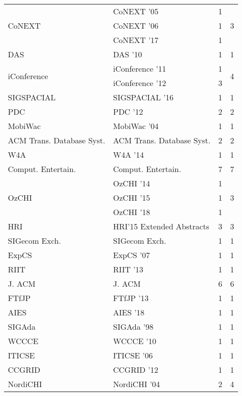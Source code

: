 \begin{table*}[t]
\begin{tabular}{llrr}
\multirow{3}{*}{CoNEXT } & CoNEXT '05 & 1 & \multirow{3}{*}{3}\\
& CoNEXT '06 & 1 &\\
& CoNEXT '17 & 1 &\\
\multirow{1}{*}{DAS } & DAS '10 & 1 & \multirow{1}{*}{1}\\
\multirow{2}{*}{iConference } & iConference '11 & 1 & \multirow{2}{*}{4}\\
& iConference '12 & 3 &\\
\multirow{1}{*}{SIGSPACIAL } & SIGSPACIAL '16 & 1 & \multirow{1}{*}{1}\\
\multirow{1}{*}{PDC } & PDC '12 & 2 & \multirow{1}{*}{2}\\
\multirow{1}{*}{MobiWac } & MobiWac '04 & 1 & \multirow{1}{*}{1}\\
\multirow{1}{*}{ACM Trans. Database Syst.} & ACM Trans. Database Syst. & 2 & \multirow{1}{*}{2}\\
\multirow{1}{*}{W4A } & W4A '14 & 1 & \multirow{1}{*}{1}\\
\multirow{1}{*}{Comput. Entertain.} & Comput. Entertain. & 7 & \multirow{1}{*}{7}\\
\multirow{3}{*}{OzCHI } & OzCHI '14 & 1 & \multirow{3}{*}{3}\\
& OzCHI '15 & 1 &\\
& OzCHI '18 & 1 &\\
\multirow{1}{*}{HRI} & HRI'15 Extended Abstracts & 3 & \multirow{1}{*}{3}\\
\multirow{1}{*}{SIGecom Exch.} & SIGecom Exch. & 1 & \multirow{1}{*}{1}\\
\multirow{1}{*}{ExpCS } & ExpCS '07 & 1 & \multirow{1}{*}{1}\\
\multirow{1}{*}{RIIT } & RIIT '13 & 1 & \multirow{1}{*}{1}\\
\multirow{1}{*}{J. ACM} & J. ACM & 6 & \multirow{1}{*}{6}\\
\multirow{1}{*}{FTfJP } & FTfJP '13 & 1 & \multirow{1}{*}{1}\\
\multirow{1}{*}{AIES } & AIES '18 & 1 & \multirow{1}{*}{1}\\
\multirow{1}{*}{SIGAda } & SIGAda '98 & 1 & \multirow{1}{*}{1}\\
\multirow{1}{*}{WCCCE } & WCCCE '10 & 1 & \multirow{1}{*}{1}\\
\multirow{1}{*}{ITICSE } & ITICSE '06 & 1 & \multirow{1}{*}{1}\\
\multirow{1}{*}{CCGRID } & CCGRID '12 & 1 & \multirow{1}{*}{1}\\
\multirow{3}{*}{NordiCHI } & NordiCHI '04 & 2 & \multirow{3}{*}{4}\\

\end{tabular}
\end{table*}
